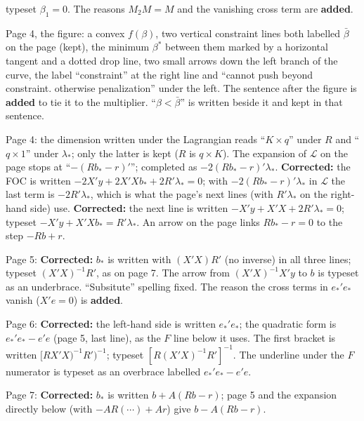 \documentclass[11pt]{article}
\begin{document}
\begin{transcriptnotes}
        typeset $\beta_{1} = 0$. The reasons $M_{2}M = M$ and the vanishing cross
        term are \textbf{added}.
  \item Page 4, the figure: a convex $f(\beta)$, two vertical constraint lines both
        labelled $\bar\beta$ on the page (kept), the minimum $\beta^{*}$ between them
        marked by a horizontal tangent and a dotted drop line, two small arrows down
        the left branch of the curve, the label ``constraint'' at the right line and
        ``cannot push beyond constraint. otherwise penalization'' under the left. The
        sentence after the figure is \textbf{added} to tie it to the multiplier.
        ``$\beta < \bar\beta$'' is written beside it and kept in that sentence.
  \item Page 4: the dimension written under the Lagrangian reads ``$K\times q$'' under
        $R$ and ``$q\times1$'' under $\lambda_{*}$; only the latter is kept ($R$ is
        $q\times K$). The expansion of $\mathcal{L}$ on the page stops at
        ``$-(Rb_{*} - r)'$''; completed as $-2(Rb_{*} - r)'\lambda_{*}$.
        \textbf{Corrected:} the FOC is written $-2X'y + 2X'Xb_{*} + 2R'\lambda_{*} = 0$;
        with $-2(Rb_{*}-r)'\lambda_{*}$ in $\mathcal{L}$ the last term is
        $-2R'\lambda_{*}$, which is what the page's next lines (with $R'\lambda_{*}$
        on the right-hand side) use. \textbf{Corrected:} the next line is written
        $-X'y + X'X + 2R'\lambda_{*} = 0$; typeset $-X'y + X'Xb_{*} = R'\lambda_{*}$.
        An arrow on the page links $Rb_{*} - r = 0$ to the step $-Rb + r$.
  \item Page 5: \textbf{Corrected:} $b_{*}$ is written with $(X'X)R'$ (no inverse) in
        all three lines; typeset $(X'X)^{-1}R'$, as on page 7. The arrow from
        $(X'X)^{-1}X'y$ to $b$ is typeset as an underbrace. ``Subsitute'' spelling
        fixed. The reason the cross terms in $e_{*}'e_{*}$ vanish ($X'e = 0$) is
        \textbf{added}.
  \item Page 6: \textbf{Corrected:} the left-hand side is written $e_{*}'e_{*}$; the
        quadratic form is $e_{*}'e_{*} - e'e$ (page 5, last line), as the $F$ line
        below it uses. The first bracket is written $[RX'X)^{-1}R')^{-1}$; typeset
        $[R(X'X)^{-1}R']^{-1}$. The underline under the $F$ numerator is typeset as an
        overbrace labelled $e_{*}'e_{*} - e'e$.
  \item Page 7: \textbf{Corrected:} $b_{*}$ is written $b + A(Rb - r)$; page 5 and the
        expansion directly below (with $-AR(\cdots) + Ar$) give $b - A(Rb - r)$.

\end{transcriptnotes}
\end{document}
